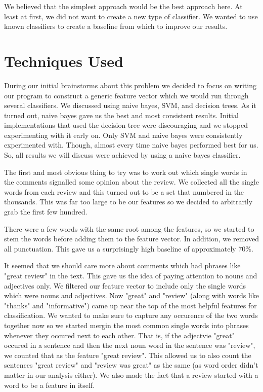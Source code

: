 \documentclass[]{report}
\begin{document}
We believed that the simplest approach would be the best approach here.  At least at first, we did not want to create a new type of classifier.  We wanted to use known classifiers to create a baseline from which to improve our results. 

\section{Techniques Used}

During our initial brainstorms about this problem we decided to focus on writing our program to construct a generic feature vector which we would run through several classifiers.  We discussed using naive bayes, SVM, and decision trees.  As it turned out, naive bayes gave us the best and most consistent results.  Initial implementations that used the decision tree were discouraging and we stopped experimenting with it early on.  Only SVM and naive bayes were consistently experimented with.  Though, almost every time naive bayes performed best for us.  So, all results we will discuss were achieved by using a naive bayes classifier.

The first and most obvious thing to try was to work out which single words in the comments signalled some opinion about the review.  We collected all the single words from each review and this turned out to be a set that numbered in the thousands.  This was far too large to be our features so we decided to arbitrarily grab the first few hundred.  

There were a few words with the same root among the features, so we started to stem the words before adding them to the feature vector.  In addition, we removed all punctuation.  This gave us a surprisingly high baseline of approximately 70\%.

It seemed that we should care more about comments which had phrases like "great review" in the text.  This gave us the idea of paying attention to nouns and adjectives only.  We filtered our feature vector to include only the single words which were nouns and adjectives.  Now "great" and "review" (along with words like "thanks" and "informative") came up near the top of the most helpful features for classification.  We wanted to make sure to capture any occurence of the two words together now so we started mergin the most common single words into phrases whenever they occured next to each other.  That is, if the adjectvie "great" occured in a sentence and then the next noun word in the sentence was "review", we counted that as the feature "great review".  This allowed us to also count the sentences "great review" and "review was great" as the same (as word order didn't matter in our analysis either).  We also made the fact that a review started with a word to be a feature in itself.
\end{document}
